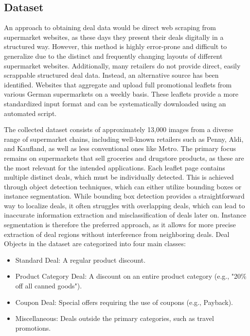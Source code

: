 \documentclass[11pt]{article}
\begin{document}
\subsection{Dataset}
An approach to obtaining deal data would be direct web scraping from supermarket websites, as these days they present their deals digitally in a structured way. However, this method is highly error-prone and difficult to generalize due to the distinct and frequently changing layouts of different supermarket websites. Additionally, many retailers do not provide direct, easily scrappable structured deal data. Instead, an alternative source has been identified. Websites that aggregate and upload full promotional leaflets from various German supermarkets on a weekly basis. These leaflets provide a more standardized input format and can be systematically downloaded using an automated script.

The collected dataset consists of approximately 13,000 images from a diverse range of supermarket chains, including well-known retailers such as Penny, Aldi, and Kaufland, as well as less conventional ones like Metro. The primary focus remains on supermarkets that sell groceries and drugstore products, as these are the most relevant for the intended applications. Each leaflet page contains multiple distinct deals, which must be individually detected. This is achieved through object detection techniques, which can either utilize bounding boxes or instance segmentation. While bounding box detection provides a straightforward way to localize deals, it often struggles with overlapping deals, which can lead to inaccurate information extraction and misclassification of deals later on. Instance segmentation is therefore the preferred approach, as it allows for more precise extraction of deal regions without interference from neighboring deals. Deal Objects in the dataset are categorized into four main classes:

\begin{itemize}
    \item Standard Deal: A regular product discount.
    \item Product Category Deal: A discount on an entire product category (e.g., "20\% off all canned goods").
    \item Coupon Deal: Special offers requiring the use of coupons (e.g., Payback).
    \item Miscellaneous: Deals outside the primary categories, such as travel promotions.
\end{itemize}
\end{document}
